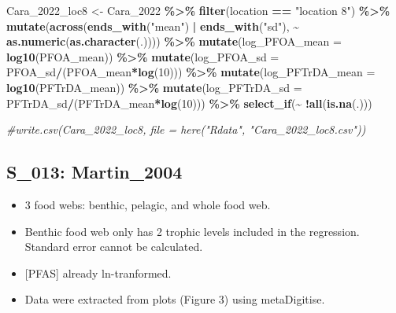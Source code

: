 \documentclass[
]{article}
\newenvironment{Shaded}{\begin{snugshade}}{\end{snugshade}}
\newcommand{\AttributeTok}[1]{\textcolor[rgb]{0.13,0.29,0.53}{#1}}
\newcommand{\CommentTok}[1]{\textcolor[rgb]{0.56,0.35,0.01}{\textit{#1}}}
\newcommand{\DecValTok}[1]{\textcolor[rgb]{0.00,0.00,0.81}{#1}}
\newcommand{\FunctionTok}[1]{\textcolor[rgb]{0.13,0.29,0.53}{\textbf{#1}}}
\newcommand{\NormalTok}[1]{#1}
\newcommand{\OtherTok}[1]{\textcolor[rgb]{0.56,0.35,0.01}{#1}}
\newcommand{\SpecialCharTok}[1]{\textcolor[rgb]{0.81,0.36,0.00}{\textbf{#1}}}
\newcommand{\StringTok}[1]{\textcolor[rgb]{0.31,0.60,0.02}{#1}}
\providecommand{\tightlist}{%
  \setlength{\itemsep}{0pt}\setlength{\parskip}{0pt}}
\begin{document}
\begin{Shaded}
\begin{Highlighting}[]
\NormalTok{Cara\_2022\_loc8 }\OtherTok{\textless{}{-}}\NormalTok{ Cara\_2022 }\SpecialCharTok{\%\textgreater{}\%} 
  \FunctionTok{filter}\NormalTok{(location }\SpecialCharTok{==} \StringTok{"location 8"}\NormalTok{) }\SpecialCharTok{\%\textgreater{}\%}
  \FunctionTok{mutate}\NormalTok{(}\FunctionTok{across}\NormalTok{(}\FunctionTok{ends\_with}\NormalTok{(}\StringTok{"mean"}\NormalTok{) }\SpecialCharTok{|} \FunctionTok{ends\_with}\NormalTok{(}\StringTok{"sd"}\NormalTok{), }\SpecialCharTok{\textasciitilde{}} \FunctionTok{as.numeric}\NormalTok{(}\FunctionTok{as.character}\NormalTok{(.)))) }\SpecialCharTok{\%\textgreater{}\%} 
  \FunctionTok{mutate}\NormalTok{(}\AttributeTok{log\_PFOA\_mean =} \FunctionTok{log10}\NormalTok{(PFOA\_mean)) }\SpecialCharTok{\%\textgreater{}\%}
  \FunctionTok{mutate}\NormalTok{(}\AttributeTok{log\_PFOA\_sd =}\NormalTok{ PFOA\_sd}\SpecialCharTok{/}\NormalTok{(PFOA\_mean}\SpecialCharTok{*}\FunctionTok{log}\NormalTok{(}\DecValTok{10}\NormalTok{))) }\SpecialCharTok{\%\textgreater{}\%}
  \FunctionTok{mutate}\NormalTok{(}\AttributeTok{log\_PFTrDA\_mean =} \FunctionTok{log10}\NormalTok{(PFTrDA\_mean)) }\SpecialCharTok{\%\textgreater{}\%}
  \FunctionTok{mutate}\NormalTok{(}\AttributeTok{log\_PFTrDA\_sd =}\NormalTok{ PFTrDA\_sd}\SpecialCharTok{/}\NormalTok{(PFTrDA\_mean}\SpecialCharTok{*}\FunctionTok{log}\NormalTok{(}\DecValTok{10}\NormalTok{))) }\SpecialCharTok{\%\textgreater{}\%}
  \FunctionTok{select\_if}\NormalTok{(}\SpecialCharTok{\textasciitilde{}} \SpecialCharTok{!}\FunctionTok{all}\NormalTok{(}\FunctionTok{is.na}\NormalTok{(.)))}

\CommentTok{\#write.csv(Cara\_2022\_loc8, file = here("Rdata", "Cara\_2022\_loc8.csv"))}
\end{Highlighting}
\end{Shaded}

\subsection{S\_013: Martin\_2004}\label{s_013-martin_2004}

\begin{itemize}
\tightlist
\item
  3 food webs: benthic, pelagic, and whole food web.
\item
  Benthic food web only has 2 trophic levels included in the regression.
  Standard error cannot be calculated.
\item
  {[}PFAS{]} already ln-tranformed.
\item
  Data were extracted from plots (Figure 3) using metaDigitise.
\end{itemize}
\end{document}
